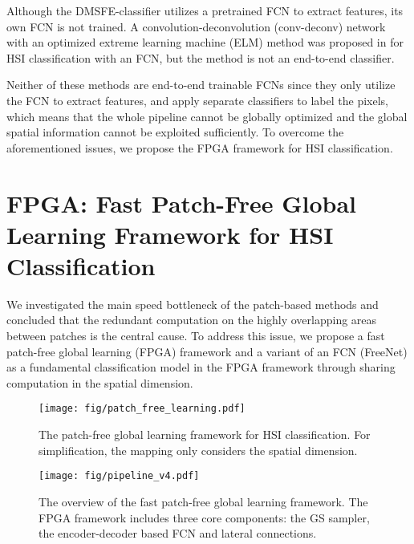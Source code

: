 \documentclass[journal]{IEEEtran}
\begin{document}
Although the DMSFE-classifier \cite{jiao2017deep} utilizes a pretrained FCN \cite{long2015fully} to extract features, its own FCN is not trained.
A convolution-deconvolution (conv-deconv) network with an optimized extreme learning machine (ELM) method was proposed in \cite{li2018classification} for HSI classification with an FCN, but the method is not an end-to-end classifier.

Neither of these methods are end-to-end trainable FCNs since they only utilize the FCN to extract features, and apply separate classifiers to label the pixels, which means that the whole pipeline cannot be globally optimized and the global spatial information cannot be exploited sufficiently.
To overcome the aforementioned issues, we propose the FPGA framework for HSI classification.


\section{FPGA: Fast Patch-Free Global Learning Framework for HSI Classification}
\label{sec:upl}
We investigated the main speed bottleneck of the patch-based methods and concluded that the redundant computation on the highly overlapping areas between patches is the central cause.
To address this issue, we propose a fast patch-free global learning (FPGA) framework and a variant of an FCN (FreeNet) as a fundamental classification model in the FPGA framework through sharing computation in the spatial dimension.

\begin{figure}[ht]
  \centering
  \texttt{[image: fig/patch\_free\_learning.pdf]}
  \caption{The patch-free global learning framework for HSI classification.
    For simplification, the mapping only considers the spatial dimension.}
  \label{fig:pfl}
\end{figure}

\begin{figure*}[ht]
  \centering
  \texttt{[image: fig/pipeline\_v4.pdf]}
  \caption{The overview of the fast patch-free global learning framework. The FPGA framework includes three core components: the GS sampler, the encoder-decoder based FCN and lateral connections.}
  \label{fig:pipeline}
\end{figure*}
\end{document}
